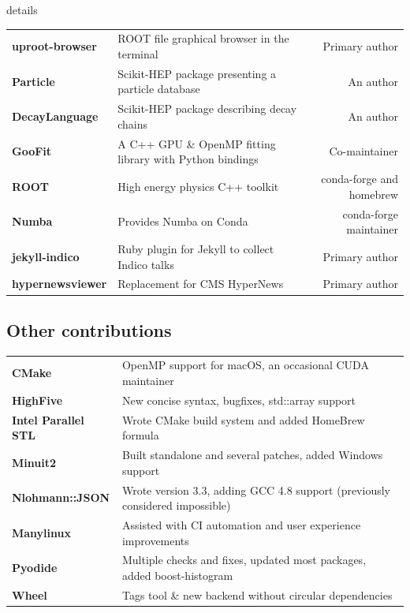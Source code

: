 \documentclass[10pt,letterpaper]{moderncv}
\begin{document}
\begin{taggedblock}{details}
\begin{tabularx}{\textwidth}{>{\bfseries}p{1.2in}Xr}
    uproot-browser & ROOT file graphical browser in the terminal & Primary author \\
    Particle & Scikit-HEP package presenting a particle database & An author \\
    DecayLanguage & Scikit-HEP package describing decay chains & An author \\
    GooFit & A C++ GPU \& OpenMP fitting library with Python bindings & Co-maintainer \\
    ROOT & High energy physics C++ toolkit & conda-forge and homebrew \\
    Numba & Provides Numba on Conda & conda-forge maintainer \\
    jekyll-indico & Ruby plugin for Jekyll to collect Indico talks & Primary author \\
    hypernewsviewer & Replacement for CMS HyperNews & Primary author \\
\end{tabularx}
\end{taggedblock}

\subsection{Other contributions}
\begin{tabularx}{\textwidth}{>{\bfseries}p{1.4in}X}
    CMake          & OpenMP support for macOS, an occasional CUDA maintainer  \\
    HighFive       & New concise syntax, bugfixes, std::array support  \\
    Intel Parallel STL & Wrote CMake build system and added HomeBrew formula \\
    Minuit2        & Built standalone and several patches, added Windows support \\
    Nlohmann::JSON & Wrote version 3.3, adding GCC 4.8 support (previously considered impossible) \\
    Manylinux      & Assisted with CI automation and user experience improvements \\
    Pyodide        & Multiple checks and fixes, updated most packages, added boost-histogram \\
    Wheel          & Tags tool \& new backend without circular dependencies \\
\end{tabularx}
\end{document}
